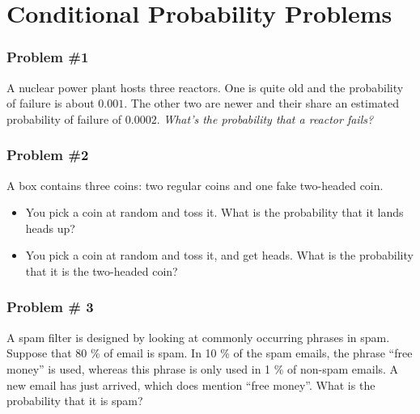 \documentclass[aspectratio=169,11pt,usenames,dvipsnames,handout]{beamer}
\begin{document}
\section{Conditional Probability Problems}

\begin{frame}
 \frametitle{Problem \#1}
 A nuclear power plant hosts three reactors. One is quite old and the
 probability of failure is about $0.001$. The other two are newer and their
 share an estimated probability of failure of $0.0002$. \emph{What's the
 probability that a reactor fails?}
\end{frame}

\begin{frame}
 \frametitle{Problem \#2}
 A box contains three coins: two regular coins and one fake two-headed coin.
 \begin{itemize}
  \item You pick a coin at random and toss it. What is the probability that it
   lands heads up?
  \item You pick a coin at random and toss it, and get heads. What is the
   probability that it is the two-headed coin?
 \end{itemize}
\end{frame}

\begin{frame}
 \frametitle{Problem \# 3}
 A spam filter is designed by looking at commonly occurring phrases in spam.
 Suppose that 80 \% of email is spam. In 10 \% of the spam emails, the phrase
 “free money” is used, whereas this phrase is only used in 1 \% of non-spam
 emails. A new email has just arrived, which does mention “free money”. What is
 the probability that it is spam?
\end{frame}
\end{document}
